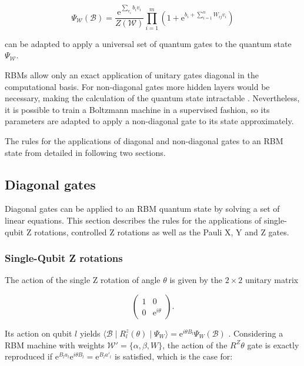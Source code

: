 \begin{equation}
   \Psi_{\mathcal{W}}(\mathcal{B}) = \frac{\mathrm{e}^{\sum_{v_i}b_iv_i}}{Z(\mathcal{W})}\prod_{i=1}^m(1+\mathrm{e}^{b_i + \sum_{i=1}^nW_{ij}v_i})
\end{equation}

can be adapted to apply a universal set of quantum gates to the quantum state $\Psi_{\mathcal{W}}$.

RBMs allow only an exact application of unitary gates diagonal in the computational basis. For non-diagonal 
gates more hidden layers would be necessary, making the calculation of the quantum state intractable \cite{carleo2018constructing}. Nevertheless, it is possible to train a Boltzmann machine in a supervised fashion, so its parameters are adapted to apply a non-diagonal gate to its state approximately.

The rules for the applications of diagonal and non-diagonal gates to an RBM state from 
\cite{jnsson2018neuralnetwork} detailed in following two sections.

\subsection{Diagonal gates}

Diagonal gates can be applied to an RBM quantum state by solving a set of linear equations. 
This section describes the rules for the applications of single-qubit Z rotations, controlled Z rotations 
as well as the Pauli X, Y and Z gates.

\subsubsection{Single-Qubit Z rotations}
The action of the single Z rotation of angle $\theta$ is given by the $2\times2$ unitary matrix

\begin{equation}
    \begin{pmatrix}
        1 & 0 \\
        0 & \mathrm{e}^{i\theta}
    \end{pmatrix} .
\end{equation}

Its action on qubit $l$ yields 
$\langle \mathcal{B} \mid R_{l}^{z}(\theta) \mid \Psi_{W}  \rangle = 
\mathrm{e}^{i\theta B_{l}} \Psi_{W}(\mathcal{B})
$
. Considering a RBM machine with weights $\mathcal{W}\prime = \{\alpha,\beta,W\}$, the action of the $R^{Z}{\theta}$
gate is exactly reproduced if $\mathrm{e}^{B_{l}a_{l}}\mathrm{e}^{i\theta B_{l}} = \mathrm{e}^{B_{l}a\prime_{l}}$
is satisfied, which is the case for:

